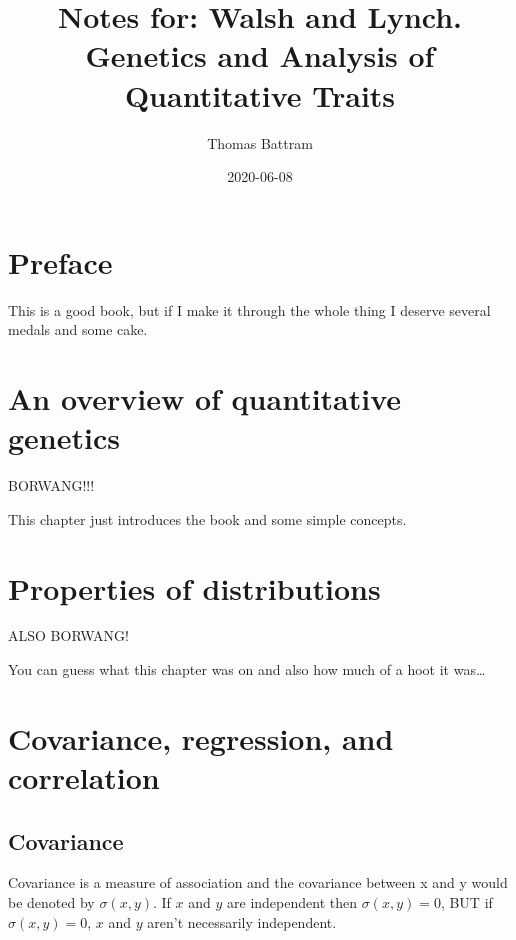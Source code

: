 \documentclass[
]{book}
\title{Notes for: Walsh and Lynch. Genetics and Analysis of Quantitative Traits}
\author{Thomas Battram}
\date{2020-06-08}
\begin{document}
\maketitle

{
\setcounter{tocdepth}{1}
\tableofcontents
}
\hypertarget{preface}{%
\chapter*{Preface}\label{preface}}

This is a good book, but if I make it through the whole thing I deserve several medals and some cake.

\hypertarget{an-overview-of-quantitative-genetics}{%
\chapter{An overview of quantitative genetics}\label{an-overview-of-quantitative-genetics}}

BORWANG!!!

This chapter just introduces the book and some simple concepts.

\hypertarget{properties-of-distributions}{%
\chapter{Properties of distributions}\label{properties-of-distributions}}

ALSO BORWANG!

You can guess what this chapter was on and also how much of a hoot it was\ldots{}

\hypertarget{covariance-regression-and-correlation}{%
\chapter{Covariance, regression, and correlation}\label{covariance-regression-and-correlation}}

\hypertarget{covariance}{%
\section{Covariance}\label{covariance}}

Covariance is a measure of association and the covariance between x and y would be denoted by \(\sigma(x, y)\). If \(x\) and \(y\) are independent then \(\sigma(x, y) = 0\), BUT if \(\sigma(x, y) = 0\), \(x\) and \(y\) aren't necessarily independent.
\end{document}
